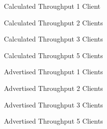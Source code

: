 \documentclass[10pt,sigconf]{acmart}
\begin{document}
\twocolumn

\begin{figure}
  \centering
  \caption{Calculated Throughput 1 Client}
  \label{fig:throughput-precise-clients-1-app}
\end{figure}

\begin{figure}
  \centering
  \caption{Calculated Throughput 2 Clients}
  \label{fig:throughput-precise-clients-2-app}
\end{figure}

\begin{figure}
  \centering
  \caption{Calculated Throughput 3 Clients}
  \label{fig:throughput-precise-clients-3-app}
\end{figure}

\begin{figure}
  \centering
  \caption{Calculated Throughput 5 Clients}
  \label{fig:throughput-precise-clients-5-app}
\end{figure}

\begin{figure}
  \centering
  \caption{Advertised Throughput 1 Clients}
  \label{fig:throughput-safe-clients-1-app}
\end{figure}

\begin{figure}
  \centering
  \caption{Advertised Throughput 2 Clients}
  \label{fig:throughput-safe-clients-2-app}
\end{figure}

\begin{figure}
  \centering
  \caption{Advertised Throughput 3 Clients}
  \label{fig:throughput-safe-clients-3-app}
\end{figure}

\begin{figure}
  \centering
  \caption{Advertised Throughput 5 Clients}
  \label{fig:throughput-safe-clients-5-app}
\end{figure}


\end{document}
